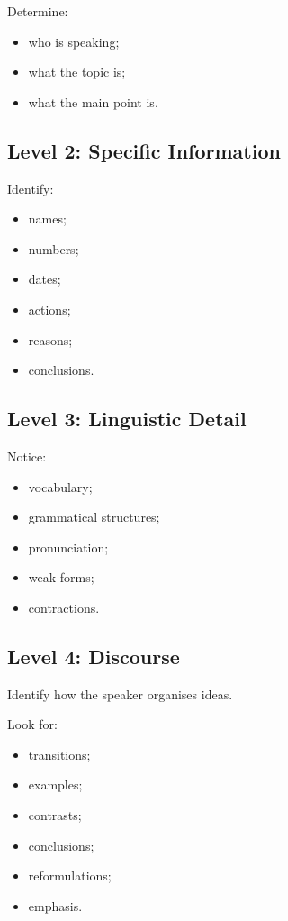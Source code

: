 Determine:

\begin{itemize}
    \item who is speaking;
    \item what the topic is;
    \item what the main point is.
\end{itemize}

\subsection*{Level 2: Specific Information}

Identify:

\begin{itemize}
    \item names;
    \item numbers;
    \item dates;
    \item actions;
    \item reasons;
    \item conclusions.
\end{itemize}

\subsection*{Level 3: Linguistic Detail}

Notice:

\begin{itemize}
    \item vocabulary;
    \item grammatical structures;
    \item pronunciation;
    \item weak forms;
    \item contractions.
\end{itemize}

\subsection*{Level 4: Discourse}

Identify how the speaker organises ideas.

Look for:

\begin{itemize}
    \item transitions;
    \item examples;
    \item contrasts;
    \item conclusions;
    \item reformulations;
    \item emphasis.
\end{itemize}

